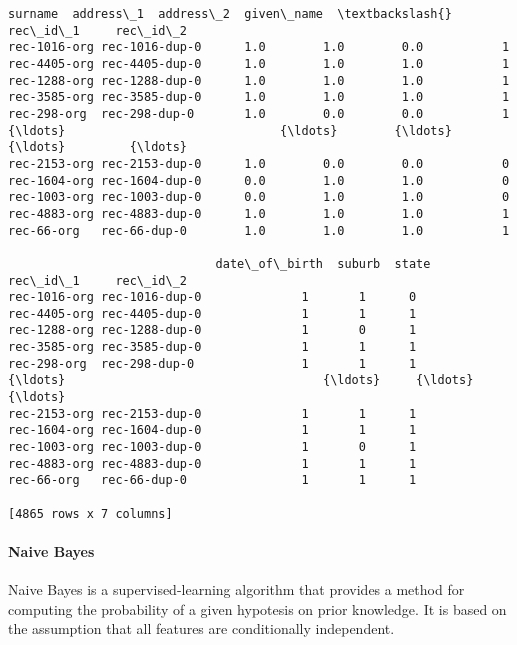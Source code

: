 \documentclass{article}
\begin{document}
    \begin{Verbatim}[commandchars=\\\{\}]

\end{Verbatim}
\begin{Verbatim}[commandchars=\\\{\}]
                             surname  address\_1  address\_2  given\_name  \textbackslash{}
rec\_id\_1     rec\_id\_2                                                    
rec-1016-org rec-1016-dup-0      1.0        1.0        0.0           1   
rec-4405-org rec-4405-dup-0      1.0        1.0        1.0           1   
rec-1288-org rec-1288-dup-0      1.0        1.0        1.0           1   
rec-3585-org rec-3585-dup-0      1.0        1.0        1.0           1   
rec-298-org  rec-298-dup-0       1.0        0.0        0.0           1   
{\ldots}                              {\ldots}        {\ldots}        {\ldots}         {\ldots}   
rec-2153-org rec-2153-dup-0      1.0        0.0        0.0           0   
rec-1604-org rec-1604-dup-0      0.0        1.0        1.0           0   
rec-1003-org rec-1003-dup-0      0.0        1.0        1.0           0   
rec-4883-org rec-4883-dup-0      1.0        1.0        1.0           1   
rec-66-org   rec-66-dup-0        1.0        1.0        1.0           1   

                             date\_of\_birth  suburb  state  
rec\_id\_1     rec\_id\_2                                      
rec-1016-org rec-1016-dup-0              1       1      0  
rec-4405-org rec-4405-dup-0              1       1      1  
rec-1288-org rec-1288-dup-0              1       0      1  
rec-3585-org rec-3585-dup-0              1       1      1  
rec-298-org  rec-298-dup-0               1       1      1  
{\ldots}                                    {\ldots}     {\ldots}    {\ldots}  
rec-2153-org rec-2153-dup-0              1       1      1  
rec-1604-org rec-1604-dup-0              1       1      1  
rec-1003-org rec-1003-dup-0              1       0      1  
rec-4883-org rec-4883-dup-0              1       1      1  
rec-66-org   rec-66-dup-0                1       1      1  

[4865 rows x 7 columns]
\end{Verbatim}
    \hypertarget{naive-bayes}{%
\paragraph{Naive Bayes}\label{naive-bayes}}

Naive Bayes is a supervised-learning algorithm that provides a method
for computing the probability of a given hypotesis on prior knowledge.
It is based on the assumption that all features are conditionally
independent.
\end{document}
